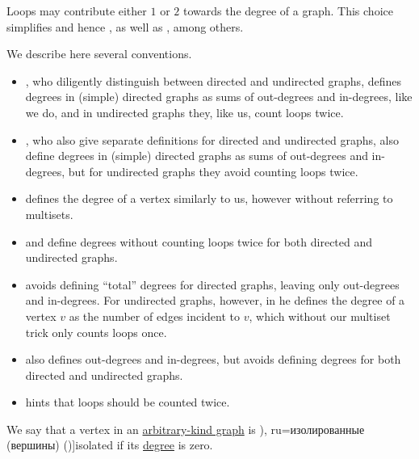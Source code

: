 \begin{remark}\label{rem:counting_loops_twice}
  Loops may contribute either \( 1 \) or \( 2 \) towards the degree of a graph. This choice simplifies  and hence , as well as , among others.

  We describe here several conventions.
  \begin{itemize}
    \item {}, who diligently distinguish between directed and undirected graphs, defines degrees in (simple) directed graphs as sums of out-degrees and in-degrees, like we do, and in undirected graphs they, like us, count loops twice.

    \item {}, who also give separate definitions for directed and undirected graphs, also define degrees in (simple) directed graphs as sums of out-degrees and in-degrees, but for undirected graphs they avoid counting loops twice.

    \item {} defines the degree of a vertex similarly to us, however without referring to multisets.

    \item {} and  define degrees without counting loops twice for both directed and undirected graphs.

    \item {} avoids defining \enquote{total} degrees for directed graphs, leaving only out-degrees and in-degrees. For undirected graphs, however, in \cite[def. 1.1.8]{Knauer2011} he defines the degree of a vertex \( v \) as the number of edges incident to \( v \), which without our multiset trick only counts loops once.

    \item {} also defines out-degrees and in-degrees, but avoids defining degrees for both directed and undirected graphs.

    \item {} hints that loops should be counted twice.
  \end{itemize}
\end{remark}

\begin{definition}\label{def:isolated_vertex}
  We say that a vertex in an \hyperref[rem:arbitrary_kind_graph]{arbitrary-kind graph} is \term[bg=изолирани (върхове) (\cite[8]{Мирчев2001}), ru=изолированные (вершины) (\cite[26]{Емеличев1990})]{isolated} if its \hyperref[def:graph_cardinality/directed_degree]{degree} is zero.
\end{definition}


